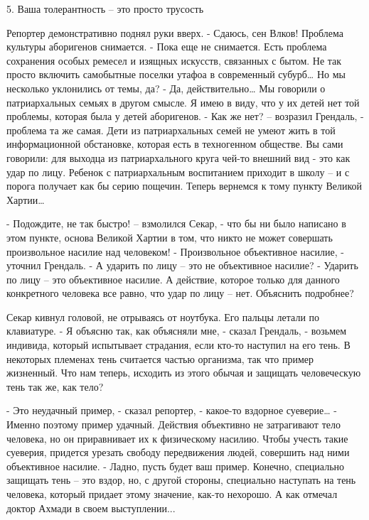 5. Ваша толерантность – это просто трусость


Репортер демонстративно поднял руки вверх.
- Сдаюсь, сен Влков! Проблема культуры аборигенов снимается.
- Пока еще не снимается. Есть проблема сохранения особых ремесел и изящных искусств, связанных с бытом. Не так просто включить самобытные поселки утафоа в современный субурб… Но мы несколько уклонились от темы, да?
- Да, действительно… Мы говорили о патриархальных семьях в другом смысле. Я имею в виду, что у их детей нет той проблемы, которая была у детей аборигенов.
- Как же нет? – возразил Грендаль, - проблема та же самая. Дети из патриархальных семей не умеют жить в той информационной обстановке, которая есть в техногенном обществе. Вы сами говорили: для выходца из патриархального круга чей-то внешний вид - это как удар по лицу. Ребенок с патриархальным воспитанием приходит в школу – и с порога получает как бы серию пощечин. Теперь вернемся к тому пункту Великой Хартии…

- Подождите, не так быстро! – взмолился Секар, - что бы ни было написано в этом пункте, основа Великой Хартии в том, что никто не может совершать произвольное насилие над человеком!
- Произвольное объективное насилие, - уточнил Грендаль.
- А ударить по лицу – это не объективное насилие?
- Ударить по лицу – это объективное насилие. А действие, которое только для данного конкретного человека все равно, что удар по лицу – нет. Объяснить подробнее?

Секар кивнул головой, не отрываясь от ноутбука. Его пальцы летали по клавиатуре.
- Я объясню так, как объясняли мне, - сказал Грендаль, - возьмем индивида, который испытывает страдания, если кто-то наступил на его тень. В некоторых племенах тень считается частью организма, так что пример жизненный. Что нам теперь, исходить из этого обычая и защищать человеческую тень так же, как тело?

- Это неудачный пример, - сказал репортер, - какое-то вздорное суеверие…
- Именно поэтому пример удачный. Действия объективно не затрагивают тело человека, но он приравнивает их к физическому насилию. Чтобы учесть такие суеверия, придется урезать свободу передвижения людей, совершить над ними объективное насилие.
- Ладно, пусть будет ваш пример. Конечно, специально защищать тень – это вздор, но, с другой стороны, специально наступать на тень человека, который придает этому значение, как-то нехорошо. А как отмечал доктор Ахмади в своем выступлении...

